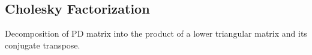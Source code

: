 \subsection{Cholesky Factorization}
\label{sec:chol}


Decomposition of PD matrix into the product of a lower triangular matrix
and its conjugate transpose.

%
%

